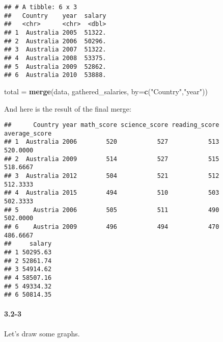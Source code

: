 \documentclass[]{article}
\newenvironment{Shaded}{\begin{snugshade}}{\end{snugshade}}
\newcommand{\KeywordTok}[1]{\textcolor[rgb]{0.13,0.29,0.53}{\textbf{#1}}}
\newcommand{\DataTypeTok}[1]{\textcolor[rgb]{0.13,0.29,0.53}{#1}}
\newcommand{\StringTok}[1]{\textcolor[rgb]{0.31,0.60,0.02}{#1}}
\newcommand{\NormalTok}[1]{#1}
\let\oldparagraph\paragraph
\renewcommand{\paragraph}[1]{\oldparagraph{#1}\mbox{}}
\begin{document}
\begin{verbatim}
## # A tibble: 6 x 3
##   Country    year  salary
##   <chr>      <chr>  <dbl>
## 1  Australia 2005  51322.
## 2  Australia 2006  50296.
## 3  Australia 2007  51322.
## 4  Australia 2008  53375.
## 5  Australia 2009  52862.
## 6  Australia 2010  53888.
\end{verbatim}

\begin{Shaded}
\begin{Highlighting}[]
\NormalTok{total =}\StringTok{ }\KeywordTok{merge}\NormalTok{(data, gathered_salaries, }\DataTypeTok{by=}\KeywordTok{c}\NormalTok{(}\StringTok{"Country"}\NormalTok{,}\StringTok{"year"}\NormalTok{))}
\end{Highlighting}
\end{Shaded}

And here is the result of the final merge:

\begin{verbatim}
##      Country year math_score science_score reading_score average_score
## 1  Australia 2006        520           527           513      520.0000
## 2  Australia 2009        514           527           515      518.6667
## 3  Australia 2012        504           521           512      512.3333
## 4  Australia 2015        494           510           503      502.3333
## 5    Austria 2006        505           511           490      502.0000
## 6    Austria 2009        496           494           470      486.6667
##     salary
## 1 50295.63
## 2 52861.74
## 3 54914.62
## 4 58507.16
## 5 49334.32
## 6 50814.35
\end{verbatim}

\paragraph{3.2-3}\label{section-11}

Let's draw some graphs.
\end{document}

